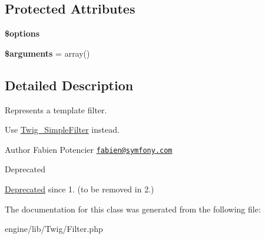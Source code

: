 \subsection*{Protected Attributes}
\begin{DoxyCompactItemize}
\item 
\hypertarget{class_twig___filter_a011800c63ece4cbbfa77136a20607023}{}{\bfseries \$options}\label{class_twig___filter_a011800c63ece4cbbfa77136a20607023}

\item 
\hypertarget{class_twig___filter_a61eded163d962fc248b3cf209000979b}{}{\bfseries \$arguments} = array()\label{class_twig___filter_a61eded163d962fc248b3cf209000979b}

\end{DoxyCompactItemize}


\subsection{Detailed Description}
Represents a template filter.

Use \hyperlink{class_twig___simple_filter}{Twig\+\_\+\+Simple\+Filter} instead.

\begin{DoxyAuthor}{Author}
Fabien Potencier \href{mailto:fabien@symfony.com}{\tt fabien@symfony.\+com} 
\end{DoxyAuthor}
\begin{DoxyRefDesc}{Deprecated}
\item[\hyperlink{deprecated__deprecated000007}{Deprecated}]since 1. (to be removed in 2.) \end{DoxyRefDesc}


The documentation for this class was generated from the following file\+:\begin{DoxyCompactItemize}
\item 
engine/lib/\+Twig/Filter.\+php\end{DoxyCompactItemize}
